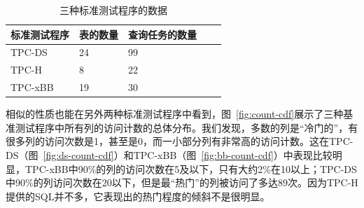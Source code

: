 \begin{table}[tbp]
    \centering
    \caption{三种标准测试程序的数据}
      \begin{tabularx}{.7\textwidth}{|l|X|X|X|r|}
      \hline
      \textbf{标准测试程序} & \textbf{表的数量} & \textbf{查询任务的数量}  \bigstrut\\ %
      \hline
      TPC-DS & 24  & 99 \bigstrut\\ %
      \hline
      TPC-H & 8  & 22 \bigstrut\\ %
      \hline
      TPC-xBB & 19  & 30 \bigstrut\\ %
      \hline
      \end{tabularx}%
    \label{tab:setup}
\end{table}


\par 相似的性质也能在另外两种标准测试程序中看到，图~\ref{fig:count-cdf}展示了三种基准测试程序中所有列的访问计数的总体分布。我们发现，多数的列是“冷门的”，有很多列的访问次数是1，甚至是0，而一小部分列有非常高的访问计数。这在TPC-DS（图~\ref{fig:ds-count-cdf}）和TPC-xBB（图~\ref{fig:bb-count-cdf}）中表现比较明显，TPC-xBB中90\%的列的访问次数在5及以下，只有大约2\%在10以上；TPC-DS中90\%的列访问次数在20以下，但是最“热门”的列被访问了多达$89$次。因为TPC-H提供的SQL并不多，它表现出的热门程度的倾斜不是很明显。


